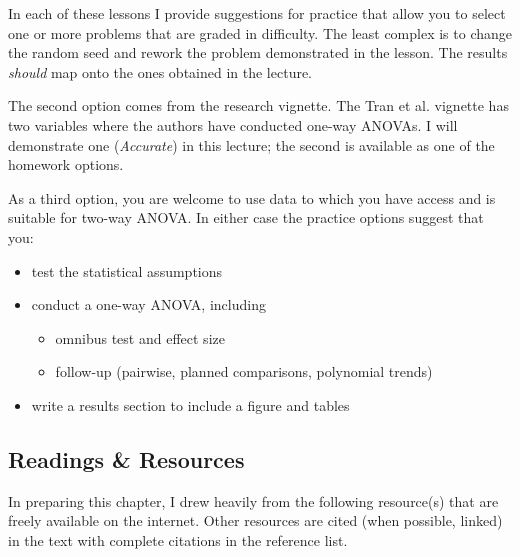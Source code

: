 \documentclass[
  11pt,
]{book}
\providecommand{\tightlist}{%
  \setlength{\itemsep}{0pt}\setlength{\parskip}{0pt}}
\begin{document}
In each of these lessons I provide suggestions for practice that allow you to select one or more problems that are graded in difficulty. The least complex is to change the random seed and rework the problem demonstrated in the lesson. The results \emph{should} map onto the ones obtained in the lecture.

The second option comes from the research vignette. The Tran et al. \citeyearpar{tran_you_2014} vignette has two variables where the authors have conducted one-way ANOVAs. I will demonstrate one (\emph{Accurate}) in this lecture; the second is available as one of the homework options.

As a third option, you are welcome to use data to which you have access and is suitable for two-way ANOVA. In either case the practice options suggest that you:

\begin{itemize}
\tightlist
\item
  test the statistical assumptions
\item
  conduct a one-way ANOVA, including

  \begin{itemize}
  \tightlist
  \item
    omnibus test and effect size
  \item
    follow-up (pairwise, planned comparisons, polynomial trends)
  \end{itemize}
\item
  write a results section to include a figure and tables
\end{itemize}

\hypertarget{readings-resources-4}{%
\subsection{Readings \& Resources}\label{readings-resources-4}}

In preparing this chapter, I drew heavily from the following resource(s) that are freely available on the internet. Other resources are cited (when possible, linked) in the text with complete citations in the reference list.
\end{document}
